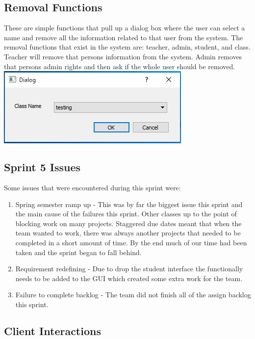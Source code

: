 \subsection{Removal Functions}
These are simple functions that pull up a dialog box where the user can select a name and remove all the information related to that user from the system. The removal functions that exist in the system are: teacher, admin, student, and class. Teacher will remove that persons information from the system. Admin removes that persons admin rights and then ask if the whole user should be removed.\\

\includegraphics[scale=0.5]{removal.png}

\subsection{Sprint 5 Issues}
Some issues that were encountered during this sprint were:

\begin{enumerate}
\item Spring semester ramp up - This was by far the biggest issue this sprint and the main cause of the failures this sprint. Other classes  up to the point of blocking work on many projects. Staggered due dates meant that when the team wanted to work, there was always another projects that needed to be completed in a short amount of time. By the end much of our time had been taken and the sprint began to fall behind.  
\item Requirement redefining - Due to drop the student interface the functionally needs to be added to the GUI which created some extra work for the team. 
\item Failure to complete backlog - The team did not finish all of the assign backlog this sprint.
\end{enumerate}

\subsection{Client Interactions}

